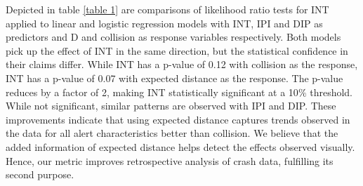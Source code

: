\documentclass{article}
\begin{document}
Depicted in table \ref{table 1} are comparisons of likelihood ratio tests for INT applied to linear and logistic regression models with INT, IPI and DIP as predictors and D and collision as response variables respectively. Both models pick up the effect of INT in the same direction, but the statistical confidence in their claims differ. While INT has a p-value of 0.12 with collision as the response, INT has a p-value of 0.07 with expected distance as the response. The p-value reduces by a factor of 2, making INT statistically significant at a 10$\%$ threshold. While not significant, similar patterns are observed with IPI and DIP. These improvements indicate that using expected distance captures trends observed in the data for all alert characteristics better than collision. We believe that the added information of expected distance helps detect the effects observed visually. Hence, our metric improves retrospective analysis of crash data, fulfilling its second purpose.
\end{document}

